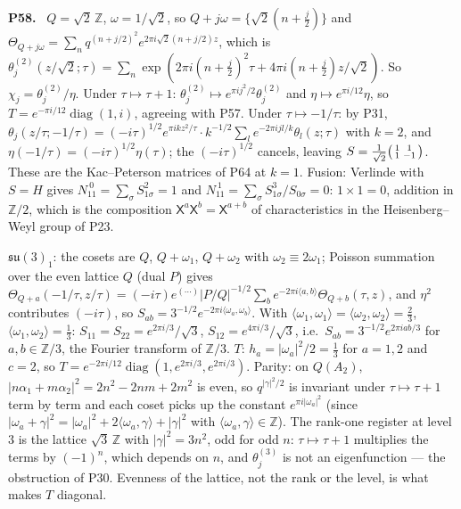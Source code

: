 \documentclass[11pt]{article}
\newcommand{\Z}{\mathbb{Z}}
\newenvironment{solution}[1]{\medskip\noindent\textbf{P#1.}\ }{\par\medskip}
\begin{document}
\begin{solution}{58}
$Q = \sqrt2\,\Z$, $\omega = 1/\sqrt2$, so $Q+j\omega = \{\sqrt2(n+\tfrac j2)\}$
and $\Theta_{Q+j\omega} = \sum_nq^{(n+j/2)^2}e^{2\pi i\sqrt2(n+j/2)z}$, which
is $\theta^{(2)}_j(z/\sqrt2;\tau) = \sum_n\exp(2\pi i(n+\tfrac j2)^2\tau+4\pi i(n+\tfrac j2)z/\sqrt2)$.
So $\chi_j = \theta^{(2)}_j/\eta$. Under $\tau\mapsto\tau+1$:
$\theta^{(2)}_j\mapsto e^{\pi ij^2/2}\theta^{(2)}_j$ and $\eta\mapsto e^{\pi i/12}\eta$,
so $T = e^{-\pi i/12}\operatorname{diag}(1,i)$, agreeing with P57. Under
$\tau\mapsto-1/\tau$: by P31, $\theta_j(z/\tau;-1/\tau) = (-i\tau)^{1/2}e^{\pi ikz^2/\tau}\cdot k^{-1/2}\sum_le^{-2\pi ijl/k}\theta_l(z;\tau)$
with $k = 2$, and $\eta(-1/\tau) = (-i\tau)^{1/2}\eta(\tau)$; the
$(-i\tau)^{1/2}$ cancels, leaving $S = \tfrac1{\sqrt2}\begin{psmallmatrix}1&1\\1&-1\end{psmallmatrix}$.
These are the Kac--Peterson matrices of P64 at $k = 1$. Fusion: Verlinde
with $S = H$ gives $N_{11}^{\ 0} = \sum_\sigma S_{1\sigma}^2 = 1$ and
$N_{11}^{\ 1} = \sum_\sigma S_{1\sigma}^3/S_{0\sigma} = 0$: $1\times1 = 0$,
addition in $\Z/2$, which is the composition
$\mathsf X^a\mathsf X^b = \mathsf X^{a+b}$ of characteristics in the
Heisenberg--Weyl group of P23.

$\mathfrak{su}(3)_1$: the cosets are $Q$, $Q+\omega_1$, $Q+\omega_2$ with
$\omega_2\equiv2\omega_1$; Poisson summation over the even lattice $Q$ (dual
$P$) gives $\Theta_{Q+a}(-1/\tau,z/\tau) = (-i\tau)e^{(\cdots)}|P/Q|^{-1/2}\sum_be^{-2\pi i\langle a,b\rangle}\Theta_{Q+b}(\tau,z)$,
and $\eta^2$ contributes $(-i\tau)$, so $S_{ab} = 3^{-1/2}e^{-2\pi i\langle\omega_a,\omega_b\rangle}$.
With $\langle\omega_1,\omega_1\rangle = \langle\omega_2,\omega_2\rangle = \tfrac23$,
$\langle\omega_1,\omega_2\rangle = \tfrac13$: $S_{11} = S_{22} = e^{2\pi i/3}/\sqrt3$,
$S_{12} = e^{4\pi i/3}/\sqrt3$, i.e.\ $S_{ab} = 3^{-1/2}e^{2\pi iab/3}$ for
$a,b\in\Z/3$, the Fourier transform of $\Z/3$. $T$: $h_a = |\omega_a|^2/2 = \tfrac13$
for $a = 1,2$ and $c = 2$, so $T = e^{-2\pi i/12}\operatorname{diag}(1,e^{2\pi i/3},e^{2\pi i/3})$.
Parity: on $Q(A_2)$, $|n\alpha_1+m\alpha_2|^2 = 2n^2-2nm+2m^2$ is even, so
$q^{|\gamma|^2/2}$ is invariant under $\tau\mapsto\tau+1$ term by term and
each coset picks up the constant $e^{\pi i|\omega_a|^2}$ (since
$|\omega_a+\gamma|^2 = |\omega_a|^2+2\langle\omega_a,\gamma\rangle+|\gamma|^2$
with $\langle\omega_a,\gamma\rangle\in\Z$). The rank-one register at level
$3$ is the lattice $\sqrt3\,\Z$ with $|\gamma|^2 = 3n^2$, odd for odd $n$:
$\tau\mapsto\tau+1$ multiplies the terms by $(-1)^{n}$, which depends on
$n$, and $\theta^{(3)}_j$ is not an eigenfunction --- the obstruction of
P30. Evenness of the lattice, not the rank or the level, is what makes $T$
diagonal.
\end{solution}
\end{document}

